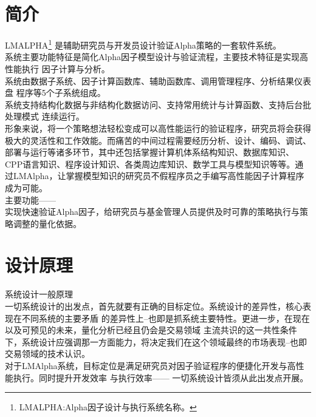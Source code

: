 
\chapter{简介}


\large{LMALPHA}\footnote{LMALPHA:Alpha因子设计与执行系统名称。}
\normalsize\phantom{L}
是辅助研究员与开发员设计验证Alpha策略的一套软件系统。\\

系统主要功能特征是简化Alpha因子模型设计与验证流程，主要技术特征是实现高性能执行
因子计算与分析。\\

系统由数据子系统、因子计算函数库、辅助函数库、调用管理程序、分析结果仪表盘
程序等5个子系统组成。\\

系统支持结构化数据与非结构化数据访问、支持常用统计与计算函数、支持后台批处理模式
连续运行。\\

形象来说，将一个策略想法轻松变成可以高性能运行的验证程序，研究员将会获得极大的灵活性和工作效能。而痛苦的中间过程需要经历分析、设计、编码、调试、部署与运行等诸多环节，其中还包括掌握计算机体系结构知识、数据库知识、CPP语言知识、程序设计知识、各类周边库知识、数学工具与模型知识等等。通过LMAlpha，让掌握模型知识的研究员不假程序员之手编写高性能因子计算程序成为可能。\\

\large{主要功能}\normalsize{}—— \\

实现快速验证Alpha因子，给研究员与基金管理人员提供及时可靠的策略执行与策略调整的量化依据。


\chapter{设计原理}

\large{系统设计一般原理}\normalsize{} \\

一切系统设计的出发点，首先就要有正确的目标定位。系统设计的差异性，核心表现在不同系统的主要矛盾
的差异性上--也即是抓系统主要特性。更进一步，在现在以及可预见的未来，量化分析已经且仍会是交易领域
主流共识的这一共性条件下，系统设计应强调那一方面能力，将决定我们在这个领域最终的市场表现--也即
交易领域的技术认识。\\

对于LMAlpha系统，目标定位是满足研究员对因子验证程序的便捷化开发与高性能执行。同时提升开发效率
与执行效率—— 一切系统设计皆须从此出发点开展。\\


